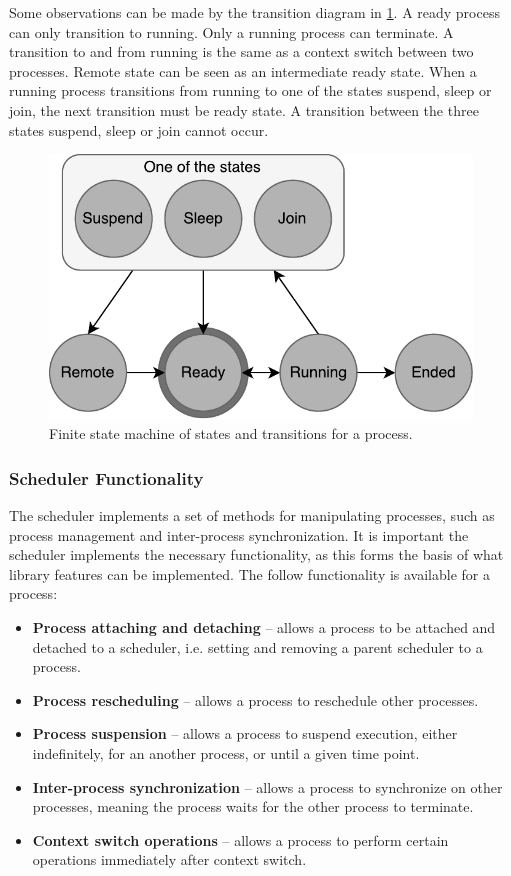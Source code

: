 Some observations can be made by the transition diagram in \cref{fig:context_states}. A ready process can only transition to running. Only a running process can terminate. A transition to and from running is the same as a context switch between two processes. Remote state can be seen as an intermediate ready state. When a running process transitions from running to one of the states suspend, sleep or join, the next transition must be ready state. A transition between the three states suspend, sleep or join cannot occur.

\begin{figure}[h!]
    \centering
    \includegraphics[width=0.7\linewidth]{fig/context_states}
    \caption{Finite state machine of states and transitions for a process.}
    \label{fig:context_states}
\end{figure}


\subsubsection{Scheduler Functionality}


The scheduler implements a set of methods for manipulating processes, such as process management and inter\hyp{}process synchronization. It is important the scheduler implements the necessary functionality, as this forms the basis of what library features can be implemented. The follow functionality is available for a process:

\begin{itemize}[topsep=0em,itemsep=-1em,partopsep=0.5em,parsep=1em]
    \item \textbf{Process attaching and detaching} -- allows a process to be attached and detached to a scheduler, i.e. setting and removing a parent scheduler to a process.
    \item \textbf{Process rescheduling} -- allows a process to reschedule other processes.
    \item \textbf{Process suspension} -- allows a process to suspend execution, either indefinitely, for an another process, or until a given time point. 
    \item \textbf{Inter\hyp{}process synchronization} -- allows a process to synchronize on other processes, meaning the process waits for the other process to terminate.
    \item \textbf{Context switch operations} -- allows a process to perform certain operations immediately after context switch.
\end{itemize}

